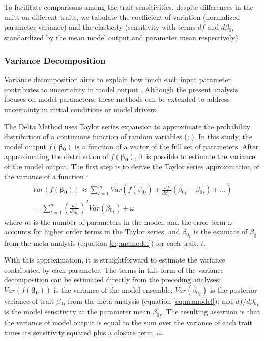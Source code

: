 \documentclass[12pt]{article}
\renewcommand{\vec}[1]{\bm{#1}} %
\begin{document}
\begin{flushleft}
\begin{spacing}{1.9}
 To facilitate comparisons among the trait sensitivities, despite differences in the units on different traits, we tabulate the coefficient of variation (normalized parameter variance) and the elasticity (sensitivity with terms $df$ and $d\beta{_0}_t$ standardized by the mean model output and parameter mean respectively).
 
\subsubsection*{Variance Decomposition}
\label{sec:vardecomp}

 Variance decomposition aims to explain how much each input parameter contributes to uncertainty in model output \citep{cariboni2007rsa}.
 Although the present analysis focuses on model parameters, these methods can be extended to address uncertainty in initial conditions or model drivers.

 The Delta Method uses Taylor series expansion to approximate the probability distribution of a continuous function of random variables (\citealp{oehlert1992ndm}; \citealp[pp. 240--245 in ][]{casella1991si}).
 In this study, the model output $f(\vec{\beta{_0}})$ is a function of a vector of the full set of parameters.
 After approximating the distribution of $f(\vec{\beta{_0}})$, it is possible to estimate the variance of the model output.
 The first step is to derive the Taylor series approximation of the variance of a function \cite[equation 5.5.9 in]{casella1991si}:
\begin{eqnarray}\label{eq:vdtaylorexpansion}
Var(f(\vec{\beta{_0}})) \approx \sum_{t=1}^{m}{Var\left(f(\overline{\beta{_0}_t}) + \frac{df}{d\beta{_0}_t}(\beta{_0}_t - \overline{\beta{_0}_t} ) + \ldots\right)} \\ 
 =  \sum_{t=1}^{m}\left(\frac{df}{d\beta{_0}_t}\right)^2 Var(\beta{_0}_t) + \omega
\end{eqnarray}
where $m$ is the number of parameters in the model, and the error term $\omega$ accounts for higher order terms in the Taylor series, and $\beta{_0}_t$ is the estimate of $\beta_0$ from the meta-analysis (equation \ref{eq:mamodel}) for each trait, $t$.
 
 With this approximation, it is straightforward to estimate the variance contributed by each parameter. 
 The terms in this form of the variance decomposition can be estimated directly from the preceding analyses: $Var(f(\vec{\beta{_0}}))$ is the variance of the model ensemble; $Var(\beta{_0}_t)$ is the posterior variance of trait $\beta{_0}_t$ from the meta-analysis (equation \ref{eq:mamodel}); and $df/d\beta{_0}_t$ is the model sensitivity at the parameter mean $\overline{\beta{_0}_t}$.
 The resulting assertion is that the variance of model output is equal to the sum over the variance of each trait times its sensitivity squared plus a closure term, $\omega$.


\end{spacing}
\end{flushleft}
\end{document}
